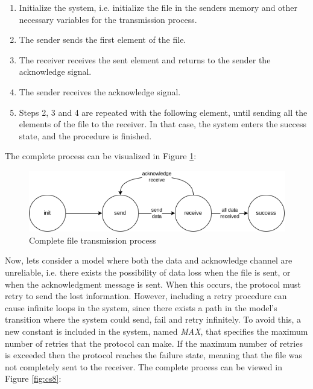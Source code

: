\begin{enumerate}
    \item Initialize the system, i.e. initialize the file in the senders memory and other necessary variables for the transmission process.
    \item The sender sends the first element of the file.
    \item The receiver receives the sent element and returns to the sender the acknowledge signal.
    \item The sender receives the acknowledge signal.
    \item Steps 2, 3 and 4 are repeated with the following element, until sending all the elements of the file to the receiver. In that case, the system enters the success state, and the procedure is finished.
\end{enumerate}
The complete process can be visualized in Figure \ref{fig:cs7}:
\begin{figure}[H]
    \centering
    \includegraphics[scale = 0.7]{images/CS7.png}
    \caption{Complete file transmission process}
    \label{fig:cs7}
\end{figure}
Now, lets consider a model where both the data and acknowledge channel are unreliable, i.e. there exists the possibility of data loss when the file is sent, or when the acknowledgment message is sent. When this occurs, the protocol must retry to send the lost information. However, including a retry procedure can cause infinite loops in the system, since there exists a path in the model's transition where the system could send, fail and retry infinitely. To avoid this, a new constant is included in the system, named \textit{MAX}, that specifies the maximum number of retries that the protocol can make. If the maximum number of retries is exceeded then the protocol reaches the failure state, meaning that the file was not completely sent to the receiver. The complete process can be viewed in Figure \ref{fig:cs8}:     
